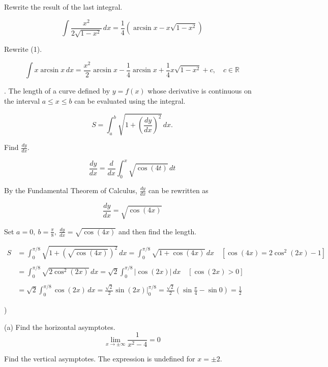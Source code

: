 \documentclass{article}
\begin{document}
\hfill

\noindent Rewrite the result of the last integral.

\[\int\frac{x^2}{2\sqrt{1-x^2}}\,dx=\frac14\left(\arcsin x-x\sqrt{1-x^2}\right)\]

\hfill

\noindent Rewrite (1).

\[\int x\arcsin x\,dx=\boxed{\frac{x^2}2\arcsin x-\frac14\arcsin x+\frac14x\sqrt{1-x^2}+c,\quad c\in\mathbb{R}}\]

\hfill

. The length of a curve defined by $y=f(x)$ whose derivative is continuous on the interval $a\leq x\leq b$ can be evaluated using the integral.

\[S=\int_a^b\sqrt{1+\left(\frac{dy}{dx}\right)^2}\,dx.\]

\hfill

\noindent Find $\displaystyle\frac{dy}{dx}$.

\[\frac{dy}{dx}=\frac d{dx}\int_0^x\sqrt{\cos(4t)}\,dt\]

\hfill

\noindent By the Fundamental Theorem of Calculus, $\displaystyle\frac{dy}{dx}$ can be rewritten as

\hfill

\[\frac{dy}{dx}=\sqrt{\cos(4x)}\]

\hfill

\noindent Set $\displaystyle a=0,\:b=\frac\pi8,\:\frac{dy}{dx}=\sqrt{\cos(4x)}$ and then find the length.

\begin{align*}S&=\int_0^{\pi/8}\sqrt{1+\left(\sqrt{\cos(4x)}\right)^2}\,dx=\int_0^{\pi/8}\sqrt{1+\cos(4x)}\,dx\quad\left[\cos(4x)=2\cos^2(2x)-1\right]\\\\&=\int_0^{\pi/8}\sqrt{2\cos^2(2x)}\,dx=\sqrt2\int_0^{\pi/8}\left|\cos(2x)\right|\,dx\quad\left[\cos(2x)>0\right]\\\\&=\sqrt2\int_0^{\pi/8}\cos(2x)\,dx=\frac{\sqrt2}2\sin(2x)\bigg|_0^{\pi/8}=\frac{\sqrt2}2\left(\sin\frac\pi4-\sin0\right)=\boxed{\frac12}\end{align*}

)

\hfill

\noindent (a) Find the horizontal asymptotes.
\[\lim_{x\to\pm\infty}\frac{1}{x^2-4}=0\]

\hfill

\noindent Find the vertical asymptotes. The expression is undefined for $x=\pm2$.
\end{document}
